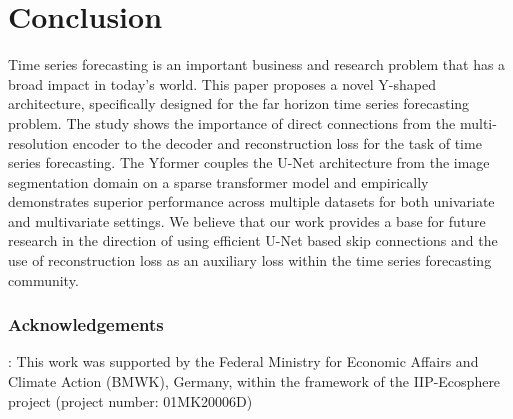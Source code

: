 \section{Conclusion}

Time series forecasting is an important business and research problem that has a broad impact in today's world. This paper proposes a novel Y-shaped architecture, specifically designed for the far horizon time series forecasting problem. The study shows the importance of direct connections from the multi-resolution encoder to the decoder and reconstruction loss for the task of time series forecasting. The Yformer couples the U-Net architecture from the image segmentation domain on a sparse transformer model and empirically demonstrates superior performance across multiple datasets for both univariate and multivariate settings. We believe that our work provides a base for future research in the direction of using efficient U-Net based skip connections and the use of reconstruction loss as an auxiliary loss within the time series forecasting community.

\subsubsection{Acknowledgements}: This work was supported by the Federal Ministry for Economic Affairs and Climate Action (BMWK), Germany, within the framework of the IIP-Ecosphere project (project number: 01MK20006D)